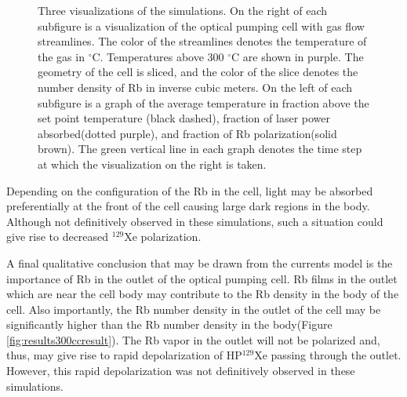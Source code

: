 \begin{figure}[t]
    \caption{Three visualizations of the simulations. On the right of each subfigure is a visualization of the optical pumping cell with gas flow streamlines. The color of the streamlines denotes the temperature of the gas in $^{\circ}$C. Temperatures above 300 $^{\circ}$C are shown in purple. The geometry of the cell is sliced, and the color of the slice denotes the number density of Rb in inverse cubic meters. On the left of each subfigure is a graph of the average temperature in fraction above the set point temperature (black dashed), fraction of laser power absorbed(dotted purple), and fraction of Rb polarization(solid brown). The green vertical line in each graph denotes the time step at which the visualization on the right is taken.}
    \label{fig:resultvisualization}
\end{figure}

Depending on the configuration of the Rb in the cell, light may be absorbed preferentially at the front of the cell causing large dark regions in the body. Although not definitively observed in these simulations, such a situation could give rise to decreased $^{129}$Xe polarization.

A final qualitative conclusion that may be drawn from the currents model is the importance of Rb in the outlet of the optical pumping cell. Rb films in the outlet which are near the cell body may contribute to the Rb density in the body of the cell. Also importantly, the Rb number density in the outlet of the cell may be significantly higher than the Rb number density in the body(Figure \ref{fig:results300ccresult}). The Rb vapor in the outlet will not be polarized and, thus, may give rise to rapid depolarization of HP$^{129}$Xe passing through the outlet. However, this rapid depolarization was not definitively observed in these simulations.